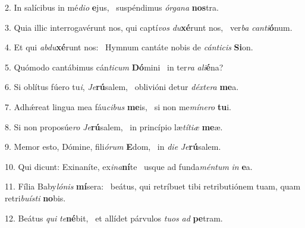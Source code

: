 2. In salícibus in mé\textit{di}\textit{o} \textbf{e}jus, \ast\  suspéndimus \textit{ór}\textit{ga}\textit{na} \textbf{nos}tra.\

3. Quia illic interrogavérunt nos, qui captí\textit{vos} \textit{du}\textbf{xé}runt nos, \ast\  ver\textit{ba} \textit{can}\textit{ti}\textbf{ó}num.\

4. Et qui \textit{ab}\textit{du}\textbf{xé}runt nos: \ast\  Hymnum cantáte nobis de \textit{cán}\textit{ti}\textit{cis} \textbf{Si}on.\

5. Quómodo cantábimus cán\textit{ti}\textit{cum} \textbf{Dó}mini \ast\  in ter\textit{ra} \textit{a}\textit{li}\textbf{é}na?\

6. Si oblítus fúero tu\textit{i}, \textit{Je}\textbf{rú}salem, \ast\  oblivióni detur \textit{déx}\textit{te}\textit{ra} \textbf{me}a.\

7. Adhǽreat lingua mea fáu\textit{ci}\textit{bus} \textbf{me}is, \ast\  si non me\textit{mí}\textit{ne}\textit{ro} \textbf{tu}i.\

8. Si non proposúe\textit{ro} \textit{Je}\textbf{rú}salem, \ast\  in princípio læ\textit{tí}\textit{ti}\textit{æ} \textbf{me}æ.\

9. Memor esto, Dómine, fili\textit{ó}\textit{rum} \textbf{E}dom, \ast\  in \textit{di}\textit{e} \textit{Je}\textbf{rú}salem.\

10. Qui dicunt: Exinaníte, ex\textit{i}\textit{na}\textbf{ní}te \ast\  usque ad funda\textit{mén}\textit{tum} \textit{in} \textbf{e}a.\

11. Fília Baby\textit{ló}\textit{nis} \textbf{mí}sera: \ast\  beátus, qui retríbuet tibi retributiónem tuam, quam retri\textit{bu}\textit{ís}\textit{ti} \textbf{no}bis.\

12. Beátus \textit{qui} \textit{te}\textbf{né}bit, \ast\  et allídet párvulos \textit{tu}\textit{os} \textit{ad} \textbf{pe}tram.\

